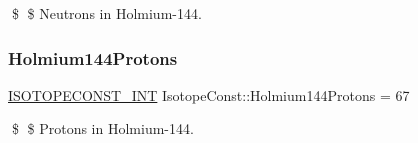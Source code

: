 \$ \$ Neutrons in Holmium-\/144. \mbox{\label{group___isotope_const-_holmium-_ho144_gaa6207c4e88bc3b067ab439f70ee747f5}} 
\subsubsection{\texorpdfstring{Holmium144\+Protons}{Holmium144Protons}}
{\footnotesize\ttfamily \mbox{\hyperlink{group___isotope_const-_macros_ga5f18360b3e99483a35c32d789e62621c}{I\+S\+O\+T\+O\+P\+E\+C\+O\+N\+S\+T\+\_\+\+I\+NT}} Isotope\+Const\+::\+Holmium144\+Protons = 67}

\$ \$ Protons in Holmium-\/144. 